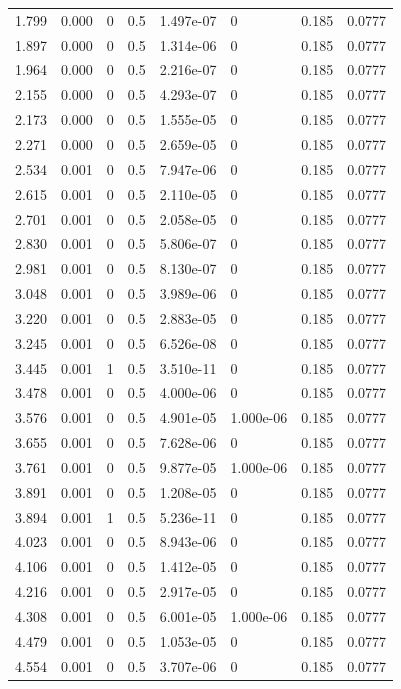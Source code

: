 \documentclass[preview]{standalone}
\begin{document}
{{\begin{tabular}{L{1.2cm}C{1.2cm} C{0.3cm}C{0.5cm} C{1.4cm}C{1.4cm} C{1.4cm}C{1.4cm}}
  1.799  &  0.000  & 0     & 0.5 &  1.497e-07  & 0  & 0.185 &  0.0777   \\ 
  1.897  &  0.000  & 0     & 0.5 &  1.314e-06  & 0  & 0.185 &  0.0777   \\ 
  1.964  &  0.000  & 0     & 0.5 &  2.216e-07  & 0  & 0.185 &  0.0777   \\ 
  2.155  &  0.000  & 0     & 0.5 &  4.293e-07  & 0  & 0.185 &  0.0777   \\ 
  2.173  &  0.000  & 0     & 0.5 &  1.555e-05  & 0  & 0.185 &  0.0777   \\ 
  2.271  &  0.000  & 0     & 0.5 &  2.659e-05  & 0  & 0.185 &  0.0777   \\ 
  2.534  &  0.001  & 0     & 0.5 &  7.947e-06  & 0  & 0.185 &  0.0777   \\ 
  2.615  &  0.001  & 0     & 0.5 &  2.110e-05  & 0  & 0.185 &  0.0777   \\ 
  2.701  &  0.001  & 0     & 0.5 &  2.058e-05  & 0  & 0.185 &  0.0777   \\ 
  2.830  &  0.001  & 0     & 0.5 &  5.806e-07  & 0  & 0.185 &  0.0777   \\ 
  2.981  &  0.001  & 0     & 0.5 &  8.130e-07  & 0  & 0.185 &  0.0777   \\ 
  3.048  &  0.001  & 0     & 0.5 &  3.989e-06  & 0  & 0.185 &  0.0777   \\ 
  3.220  &  0.001  & 0     & 0.5 &  2.883e-05  & 0  & 0.185 &  0.0777   \\ 
  3.245  &  0.001  & 0     & 0.5 &  6.526e-08  & 0  & 0.185 &  0.0777   \\ 
  3.445  &  0.001  & 1     & 0.5 &  3.510e-11  & 0  & 0.185 &  0.0777   \\ 
  3.478  &  0.001  & 0     & 0.5 &  4.000e-06  & 0  & 0.185 &  0.0777   \\ 
  3.576  &  0.001  & 0     & 0.5 &  4.901e-05  & 1.000e-06  & 0.185 &  0.0777   \\ 
  3.655  &  0.001  & 0     & 0.5 &  7.628e-06  & 0  & 0.185 &  0.0777   \\ 
  3.761  &  0.001  & 0     & 0.5 &  9.877e-05  & 1.000e-06  & 0.185 &  0.0777   \\ 
  3.891  &  0.001  & 0     & 0.5 &  1.208e-05  & 0  & 0.185 &  0.0777   \\ 
  3.894  &  0.001  & 1     & 0.5 &  5.236e-11  & 0  & 0.185 &  0.0777   \\ 
  4.023  &  0.001  & 0     & 0.5 &  8.943e-06  & 0  & 0.185 &  0.0777   \\ 
  4.106  &  0.001  & 0     & 0.5 &  1.412e-05  & 0  & 0.185 &  0.0777   \\ 
  4.216  &  0.001  & 0     & 0.5 &  2.917e-05  & 0  & 0.185 &  0.0777   \\ 
  4.308  &  0.001  & 0     & 0.5 &  6.001e-05  & 1.000e-06  & 0.185 &  0.0777   \\ 
  4.479  &  0.001  & 0     & 0.5 &  1.053e-05  & 0  & 0.185 &  0.0777   \\ 
  4.554  &  0.001  & 0     & 0.5 &  3.707e-06  & 0  & 0.185 &  0.0777   \\ 
\hline 
\end{tabular} 

}}
\end{document}
